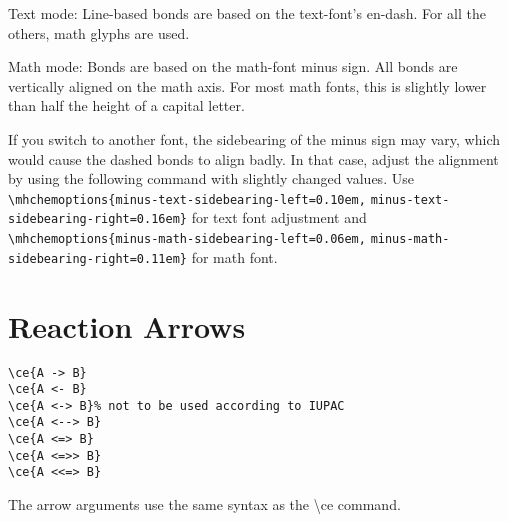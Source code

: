 \documentclass[a4paper,notitlepage,parskip=half]{scrreprt}
\newcommand\macro[1]{{\ttfamily\textbackslash#1}}
\begin{document}
Text mode: Line-based bonds are based on the text-font's en-dash. For all the others, math glyphs are used.

Math mode: Bonds are based on the math-font minus sign.  All bonds are vertically aligned on the math axis. For most math fonts, this  is slightly lower than half the height of a capital letter.

If you switch to another font, the sidebearing of the minus sign may vary, which would cause the dashed bonds to align badly. In that  case, adjust the alignment by using the following command with slightly changed values. Use \verb|\mhchemoptions{minus-text-sidebearing-left=0.10em,| \verb|minus-text-sidebearing-right=0.16em}| for text font adjustment and \verb|\mhchemoptions{minus-math-sidebearing-left=0.06em,| \verb|minus-math-sidebearing-right=0.11em}| for math font.


\section{Reaction Arrows}

\verb|\ce{A -> B}|\\
\verb|\ce{A <- B}|\\
\verb|\ce{A <-> B}% not to be used according to IUPAC|\\ %
\verb|\ce{A <--> B}|\\
\verb|\ce{A <=> B}|\\
\verb|\ce{A <=>> B}|\\
\verb|\ce{A <<=> B}|

The arrow arguments use the same syntax as the \macro{ce} command.

\begin{SideBySideExample}[xrightmargin=3cm]
  \\%
  \sffamily\bfseries
\end{SideBySideExample}

\begin{SideBySideExample}[xrightmargin=3cm]
  \\%
  \sffamily\bfseries
\end{SideBySideExample}

\begin{SideBySideExample}[xrightmargin=3cm]
  \\%
  \sffamily\bfseries
\end{SideBySideExample}
\end{document}
